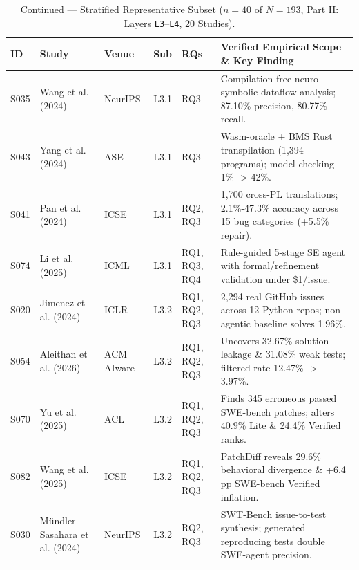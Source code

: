 \documentclass[10pt,twocolumn,a4paper]{article}
\begin{document}
\addtocounter{table}{-1}
\begin{table}[t!]
\centering
\caption{Continued --- Stratified Representative Subset ($n = 40$ of $N = 193$, Part II: Layers \texttt{L3}--\texttt{L4}, 20 Studies).}
\scriptsize
\setlength{\tabcolsep}{3.2pt}
\renewcommand{\arraystretch}{0.95}
\begin{tabularx}{\textwidth}{l >{\raggedright\arraybackslash}p{2.65cm} >{\raggedright\arraybackslash}p{2.05cm} c >{\raggedright\arraybackslash}p{1.40cm} X}
\toprule
\textbf{ID} & \textbf{Study} & \textbf{Venue} & \textbf{Sub} & \textbf{RQs} & \textbf{Verified Empirical Scope \& Key Finding} \\
\midrule
S035 & Wang et al. (2024)~\cite{wang2024llmdfa} & NeurIPS & L3.1 & RQ3 & Compilation-free neuro-symbolic dataflow analysis; 87.10\% precision, 80.77\% recall. \\
S043 & Yang et al. (2024)~\cite{yang2024vert} & ASE & L3.1 & RQ3 & Wasm-oracle + BMS Rust transpilation (1,394 programs); model-checking 1\% -> 42\%. \\
S041 & Pan et al. (2024)~\cite{pan2024lost} & ICSE & L3.1 & RQ2, RQ3 & 1,700 cross-PL translations; 2.1\%-47.3\% accuracy across 15 bug categories (+5.5\% repair). \\
S074 & Li et al. (2025)~\cite{li2025patchpilot} & ICML & L3.1 & RQ1, RQ3, RQ4 & Rule-guided 5-stage SE agent with formal/refinement validation under \$1/issue. \\
S020 & Jimenez et al. (2024)~\cite{jimenez2024swebench} & ICLR & L3.2 & RQ1, RQ2, RQ3 & 2,294 real GitHub issues across 12 Python repos; non-agentic baseline solves 1.96\%. \\
S054 & Aleithan et al. (2026)~\cite{aleithan2026swebench} & ACM AIware & L3.2 & RQ1, RQ2, RQ3 & Uncovers 32.67\% solution leakage \& 31.08\% weak tests; filtered rate 12.47\% -> 3.97\%. \\
S070 & Yu et al. (2025)~\cite{yu2025utboost} & ACL & L3.2 & RQ1, RQ2, RQ3 & Finds 345 erroneous passed SWE-bench patches; alters 40.9\% Lite \& 24.4\% Verified ranks. \\
S082 & Wang et al. (2025)~\cite{wang2025solved} & ICSE & L3.2 & RQ1, RQ2, RQ3 & PatchDiff reveals 29.6\% behavioral divergence \& +6.4 pp SWE-bench Verified inflation. \\
S030 & M{\"u}ndler-Sasahara et al. (2024)~\cite{mndlersasahara2024swtbench} & NeurIPS & L3.2 & RQ2, RQ3 & SWT-Bench issue-to-test synthesis; generated reproducing tests double SWE-agent precision. \\

\end{tabularx}
\end{table}
\end{document}
